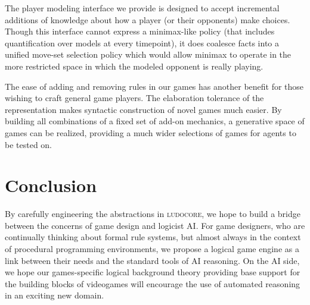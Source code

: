 \documentclass[letterpaper]{article}
\newcommand{\ludocore}{\textsc{ludocore}}
\begin{document}
The player modeling interface we provide is designed to accept incremental
additions of knowledge about how a player (or their opponents) make choices.
Though this interface cannot express a minimax-like policy (that includes
quantification over models at every timepoint), it does coalesce facts into a
unified move-set selection policy which would allow minimax to operate in the
more restricted space in which the modeled opponent is really playing.

The ease of adding and removing rules in our games has another benefit for
those wishing to craft general game players. The elaboration tolerance of the
representation makes syntactic construction of novel games much easier. By
building all combinations of a fixed set of add-on mechanics, a generative
space of games can be realized, providing a much wider selections of games for
agents to be tested on. 

\section{Conclusion}

By carefully engineering the abstractions in \ludocore, we hope to
build a bridge between the concerns of game design and logicist AI. For game
designers, who are continually thinking about formal rule systems, but almost
always in the context of procedural programming environments, we propose a
logical game engine as a link between their needs and the standard tools of AI
reasoning. On the AI side, we hope our games-specific logical background theory
providing base support for the building blocks of videogames will encourage the
use of automated reasoning in an exciting new domain.

{\small

}
\end{document}
